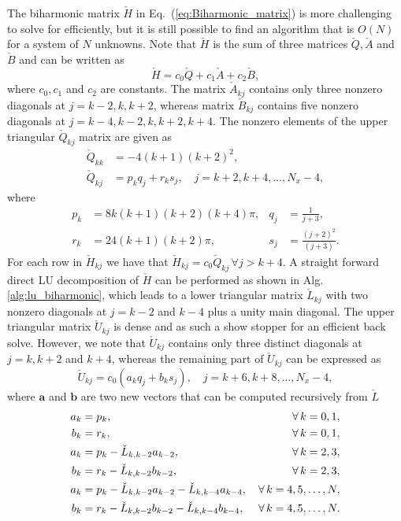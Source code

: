 \documentclass[11pt, oneside]{article}
\newcommand{\N}[1]{\check{#1}}
\begin{document}
The biharmonic matrix $\N{H}$ in Eq.~(\ref{eq:Biharmonic_matrix}) is more 
challenging to solve for efficiently, but 
it is still possible to find an algorithm that is $O(N)$ for a system of $N$ 
unknowns. Note 
that $\N{H}$ is the sum of three matrices $\N{Q}, \N{A}$ and $\N{B}$ and can be 
written as
\begin{equation}
\N{H} = c_0\N{Q} + c_1\N{A} + c_2 \N{B},
\end{equation}
where $c_0, c_1$ and $c_2$ are constants. The matrix $\N{A}_{kj}$ contains only 
three nonzero diagonals at $ j = k-2, k, k+2$,  whereas matrix $\N{B}_{kj}$ 
contains five 
nonzero diagonals at $ j = k-4, k-2, k, k+2, k+4$. The nonzero elements of the 
upper triangular $\N{Q}_{kj}$ matrix are given as
\begin{align}
 \N{Q}_{kk} &= -4(k+1)(k+2)^2, \\
 \N{Q}_{kj} &= p_kq_j + r_ks_j, \quad j = k+2, k+4, \ldots, N_x-4,
\end{align}
where 
\begin{align}
p_k &= 8 k (k+1)(k+2)(k+4)\pi, &q_j &= \frac{1}{j+3}, \label{eq:pk} \\
r_k &= 24(k+1)(k+2)\pi, &s_j &=  \frac{(j+2)^2}{(j+3)}. \label{eq:rk}
\end{align} 
For each row in $\N{H}_{kj}$ we have that $\N{H}_{kj}=c_0\N{Q}_{kj}\, \forall j 
> k+4$. A straight forward direct LU decomposition of $\N{H}$ can be performed 
as shown in Alg. 
\ref{alg:lu_biharmonic}, which leads to a lower triangular 
matrix $\N{L}_{kj}$ with two nonzero diagonals at $j=k-2$ and $k-4$ plus a 
unity 
main diagonal. The upper triangular matrix $\N{U}_{kj}$ is dense and as such a 
show stopper for an efficient back solve. However, we note that $\N{U}_{kj}$ 
contains only three distinct 
diagonals at $j=k, k+2$ and $k+4$, whereas the remaining part of $\N{U}_{kj}$ 
can be expressed as
\begin{equation}
\N{U}_{kj} = c_0(a_k q_j + b_k s_j), \quad j = k+6, k+8, \ldots, N_x-4, 
\label{eq:ab}
\end{equation}
where $\bm{a}$ and $\bm{b}$ are two new vectors that can be computed 
recursively from $\N{L}$ 
\begin{align}
a_k &= p_k, \, &\forall \, k= 0, 1, \notag \\
b_k &= r_k, \, &\forall \, k= 0, 1, \notag\\
a_k &= p_k - \N{L}_{k,k-2}a_{k-2}, \, &\forall \, k = 2, 3, \notag\\
b_k &= r_k - \N{L}_{k,k-2}b_{k-2}, \, &\forall \, k = 2, 3, \notag\\
a_k &= p_k - \N{L}_{k,k-2}a_{k-2} - \N{L}_{k,k-4}a_{k-4}, \, &\forall \, k = 4, 
5, 
\ldots, N, \notag\\
b_k &= r_k - \N{L}_{k,k-2}b_{k-2} - \N{L}_{k,k-4}b_{k-4}, \, &\forall \, k = 4, 
5, 
\ldots, N.
\end{align}
\end{document}
